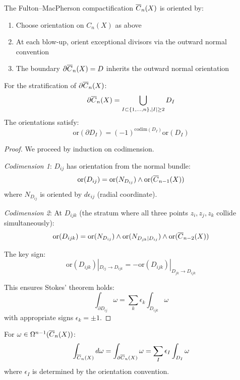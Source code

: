 \begin{definition}
The Fulton--MacPherson compactification $\overline{C}_{n}(X)$ is oriented by:
\begin{enumerate}
\item Choose orientation on $C_n(X)$ as above
\item At each blow-up, orient exceptional divisors via the outward normal convention
\item The boundary $\partial\overline{C}_{n}(X) = D$ inherits the outward normal orientation
\end{enumerate}
\end{definition}

\begin{lemma}
\label{lem:orientation-compatibility}
For the stratification of $\partial\overline{C}_{n}(X)$:
\[\partial\overline{C}_{n}(X) = \bigcup_{I \subset \{1,\ldots,n\}, |I| \geq 2} D_I\]
The orientations satisfy:
\[\text{or}(\partial D_I) = (-1)^{\text{codim}(D_I)} \text{or}(D_I)\]
\end{lemma}

\begin{proof}
We proceed by induction on codimension.

\emph{Codimension 1}: $D_{ij}$ has orientation from the normal bundle:
\[\text{or}(D_{ij}) = \text{or}(N_{D_{ij}}) \wedge \text{or}(\overline{C}_{n-1}(X))\]
where $N_{D_{ij}}$ is oriented by $d\epsilon_{ij}$ (radial coordinate).

\emph{Codimension 2}: At $D_{ijk}$ (the stratum where all three points $z_i, z_j, z_k$ collide simultaneously):
\[\text{or}(D_{ijk}) = \text{or}(N_{D_{ij}}) \wedge \text{or}(N_{D_{jk}|D_{ij}}) \wedge \text{or}(\overline{C}_{n-2}(X))\]

The key sign:
\[\text{or}(D_{ijk})|_{D_{ij} \to D_{ijk}} = -\text{or}(D_{ijk})|_{D_{jk} \to D_{ijk}}\]

This ensures Stokes' theorem holds:
\[\int_{\partial D_{ij}} \omega = \sum_{k} \epsilon_k \int_{D_{ijk}} \omega\]
with appropriate signs $\epsilon_k = \pm 1$.
\end{proof}

\begin{theorem}
\label{thm:stokes-config-spaces}
For $\omega \in \Omega^{n-1}(\overline{C}_{n}(X))$:
\[\int_{\overline{C}_{n}(X)} d\omega = \int_{\partial\overline{C}_{n}(X)} \omega = \sum_{I} \epsilon_I \int_{D_I} \omega\]
where $\epsilon_I$ is determined by the orientation convention.
\end{theorem}

